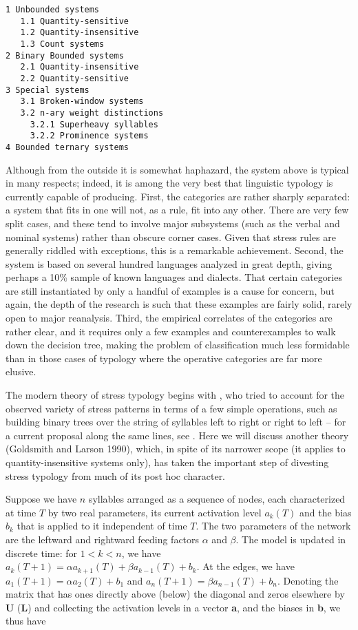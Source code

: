 \begin{verbatim}
1 Unbounded systems
   1.1 Quantity-sensitive
   1.2 Quantity-insensitive
   1.3 Count systems
2 Binary Bounded systems
   2.1 Quantity-insensitive
   2.2 Quantity-sensitive
3 Special systems
   3.1 Broken-window systems
   3.2 n-ary weight distinctions
     3.2.1 Superheavy syllables
     3.2.2 Prominence systems
4 Bounded ternary systems
\end{verbatim}

\smallskip\noindent Although from the outside it is somewhat haphazard, the
system above is typical in many respects; indeed, it is among the very best
that linguistic typology is currently capable of producing. First, the
categories are rather sharply separated: a system that fits in one will not,
as a rule, fit into any other.  There are very few split cases, and these tend
to involve major subsystems (such as the verbal and nominal systems) rather
than obscure corner cases.  Given that stress rules are generally riddled with
exceptions, this is a remarkable achievement. Second, the system is based on
several hundred languages analyzed in great depth, giving perhaps a 10\%
sample of known languages and dialects. That certain categories are still
instantiated by only a handful of examples is a cause for concern, but again,
the depth of the research is such that these examples are fairly solid, rarely
open to major reanalysis. Third, the empirical correlates of the categories
are rather clear, and it requires only a few examples and counterexamples to
walk down the decision tree, making the problem of classification much less
formidable than in those cases of typology where the operative categories are
far more elusive.

The modern theory of stress typology begins with , who
tried to account for the observed variety of stress patterns in terms of a few
simple operations, such as building binary trees over the string of syllables
left to right or right to left -- for a current proposal along the same lines,
see . Here we will discuss another theory (Goldsmith and
Larson 1990), which, in spite of its narrower scope (it applies to
quantity-insensitive systems only), has taken the important step of divesting
stress typology from much of its post hoc character.
\nocite{Goldsmith:1990a}

Suppose we have $n$ syllables arranged as a sequence of nodes, each
characterized at time $T$ by two real parameters, its current activation level
$a_k(T)$ and the bias $b_k$ that is applied to it independent of time $T$. The
two parameters of the network are the leftward and rightward feeding factors
$\alpha$ and $\beta$. The model is updated in discrete time: for $ 1 < k < n$,
we have $a_k(T+1) = \alpha a_{k+1}(T) + \beta a_{k-1}(T) + b_k$. At the edges,
we have $a_1(T+1) = \alpha a_2(T) + b_1$ and $a_n(T+1) = \beta a_{n-1}(T)
+b_n$. Denoting the matrix that has ones directly above (below) the diagonal
and zeros elsewhere by {\bf U} ({\bf L}) and collecting the activation levels
in a vector {\bf a}, and the biases in {\bf b}, we thus have

